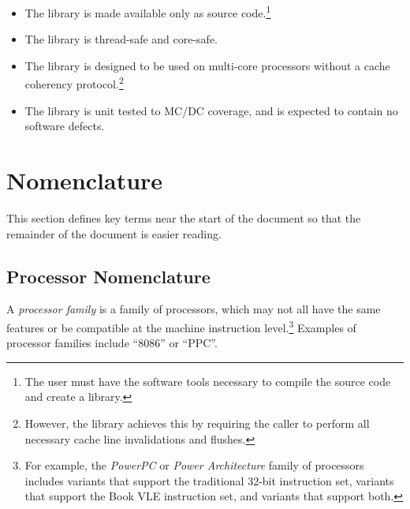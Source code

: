 \begin{itemize}
{      eliminate unused functions and data structures from these files so that the FLASH footprint
      is the same as if a library is used.}
\item The library is made available only as source code.\footnote{The user must
      have the software tools necessary to compile the source code and create a
      library.}
\item The library is thread-safe and core-safe.
\item The library is designed to be used on multi-core processors without
      a cache coherency protocol.\footnote{However, the library achieves this by
      requiring the caller to perform all necessary cache line invalidations
      and flushes.}
\item The library is unit tested to MC/DC coverage, and is 
      expected to contain no software defects.  
\end{itemize}


\section{Nomenclature}
\label{ciov0:snom0}

This section defines key terms near the start of the 
document so that the remainder of the document is easier 
reading.  


\subsection{Processor Nomenclature}
\label{ciov0:snom0:sptr0}

A \emph{processor family} is a 
family of processors, which may not all have the same 
features or be compatible at the machine instruction 
level.\footnote{For example, the \emph{PowerPC} or 
\emph{Power Architecture} family of processors includes 
variants that support the traditional 32-bit instruction 
set, variants that support the Book VLE instruction set, and 
variants that support both.} Examples of processor families 
include ``8086'' or ``PPC''.  

